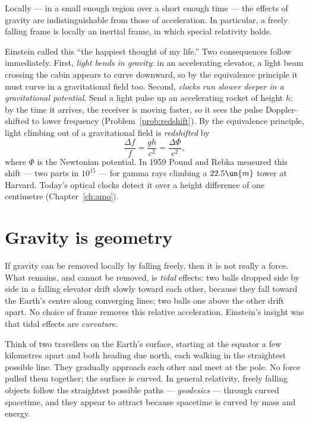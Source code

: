 \begin{law}
Locally --- in a small enough region over a short enough time --- the effects of gravity are indistinguishable from those of acceleration. In particular, a freely falling frame is locally an inertial frame, in which special relativity holds.
\end{law}

Einstein called this ``the happiest thought of my life.'' Two consequences follow immediately. First, \emph{light bends in gravity}: in an accelerating elevator, a light beam crossing the cabin appears to curve downward, so by the equivalence principle it must curve in a gravitational field too. Second, \emph{clocks run slower deeper in a gravitational potential}. Send a light pulse up an accelerating rocket of height $h$: by the time it arrives, the receiver is moving faster, so it sees the pulse Doppler-shifted to lower frequency (Problem~\ref{prob:redshift}). By the equivalence principle, light climbing out of a gravitational field is \emph{redshifted} by
\[
  \frac{\Delta f}{f} = \frac{gh}{c^2} = \frac{\Delta\Phi}{c^2},
\]
where $\Phi$ is the Newtonian potential. In 1959 Pound and Rebka measured this shift --- two parts in $10^{15}$ --- for gamma rays climbing a $22.5\un{m}$ tower at Harvard. Today's optical clocks detect it over a height difference of one centimetre (Chapter~\ref{ch:amo}).

\section{Gravity is geometry}

If gravity can be removed locally by falling freely, then it is not really a force. What remains, and cannot be removed, is \emph{tidal} effects: two balls dropped side by side in a falling elevator drift slowly toward each other, because they fall toward the Earth's centre along converging lines; two balls one above the other drift apart. No choice of frame removes this relative acceleration. Einstein's insight was that tidal effects are \emph{curvature}.

Think of two travellers on the Earth's surface, starting at the equator a few kilometres apart and both heading due north, each walking in the straightest possible line. They gradually approach each other and meet at the pole. No force pulled them together; the surface is curved. In general relativity, freely falling objects follow the straightest possible paths --- \emph{geodesics} --- through curved spacetime, and they appear to attract because spacetime is curved by mass and energy.


